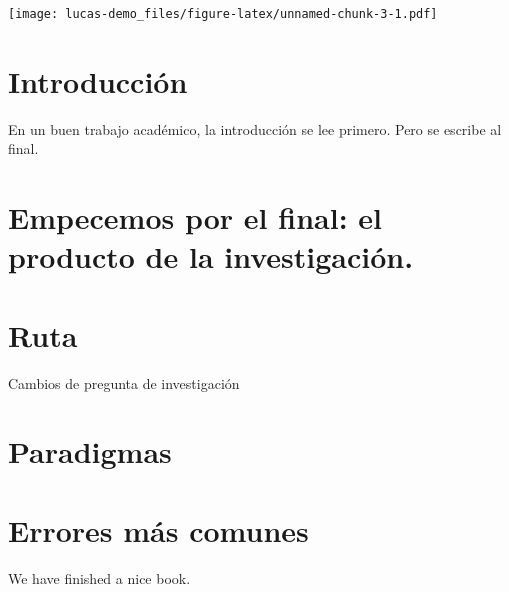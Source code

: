 \documentclass[
]{book}
\begin{document}
\texttt{[image: lucas-demo\_files/figure-latex/unnamed-chunk-3-1.pdf]}

\hypertarget{intro}{%
\chapter{Introducción}\label{intro}}

En un buen trabajo académico, la introducción se lee primero. Pero se escribe al final.

\hypertarget{empecemos-por-el-final-el-producto-de-la-investigaciuxf3n.}{%
\chapter{Empecemos por el final: el producto de la investigación.}\label{empecemos-por-el-final-el-producto-de-la-investigaciuxf3n.}}

\hypertarget{ruta}{%
\chapter{Ruta}\label{ruta}}

Cambios de pregunta de investigación

\hypertarget{paradigmas}{%
\chapter{Paradigmas}\label{paradigmas}}

\hypertarget{errores-muxe1s-comunes}{%
\chapter{Errores más comunes}\label{errores-muxe1s-comunes}}

We have finished a nice book.

  
\end{document}

